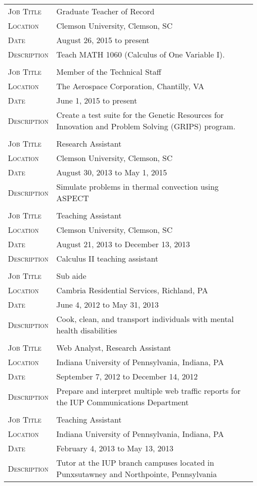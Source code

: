 \documentclass[10pt]{article}
\begin{document}
\begin{tabularx}{0.97\linewidth}{>{\raggedleft\scshape}p{3cm}X}
  Job Title    & Graduate Teacher of Record\\
  Location     & Clemson University, Clemson, SC\\
  Date         & August 26, 2015 to present\\
  Description  & Teach MATH 1060 (Calculus of One Variable I).\\
               & \\
  Job Title    & Member of the Technical Staff\\
  Location     & The Aerospace Corporation, Chantilly, VA\\
  Date         & June 1, 2015 to present\\
  Description  & Create a test suite for the Genetic Resources for Innovation and Problem Solving (GRIPS) program.\\
               & \\
  Job Title    & Research Assistant\\
  Location     & Clemson University, Clemson, SC\\
  Date         & August 30, 2013 to May 1, 2015\\
  Description  & Simulate problems in thermal convection using ASPECT\\
               & \\
  Job Title    & Teaching Assistant\\
  Location     & Clemson University, Clemson, SC\\
  Date         & August 21, 2013 to December 13, 2013\\
  Description  & Calculus II teaching assistant\\
               & \\
  Job Title    & Sub aide\\
  Location     & Cambria Residential Services, Richland, PA\\
  Date         & June 4, 2012 to May 31, 2013  \\
  Description  & Cook, clean, and transport individuals with mental health disabilities\\
  & \\
   Job Title    & Web Analyst, Research Assistant\\
  Location     & Indiana University of Pennsylvania, Indiana, PA\\
  Date         & September 7, 2012 to December 14, 2012\\
  Description  & Prepare and interpret multiple web traffic reports for the IUP Communications
   Department\\
    & \\ 
  Job Title    & Teaching Assistant\\
  Location     & Indiana University of Pennsylvania, Indiana, PA\\
  Date         & February 4, 2013 to May 13, 2013\\
  Description  & Tutor at the IUP branch campuses located in Punxsutawney and Northpointe, Pennsylvania\\
\end{tabularx}
\end{document}
